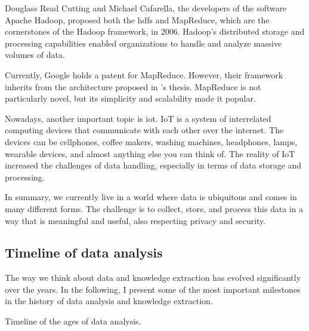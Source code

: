 Douglass Read Cutting and Michael Cafarella, the developers of the software Apache Hadoop,
proposed both the \gls{hdfs} and MapReduce, which are the
cornerstones of the Hadoop framework, in 2006.  Hadoop's distributed storage and
processing capabilities enabled organizations to handle and analyze massive volumes of
data.

Currently, Google holds a patent for
MapReduce.
However, their framework inherits from the architecture proposed in
\textcite{Hillis1985}'s thesis.
MapReduce is not particularly novel, but its simplicity and scalability made it popular.

Nowadays, another important topic is \gls{iot}.  IoT is a system of
interrelated computing devices that communicate with each other over the internet.
The devices can be cellphones, coffee makers, washing machines, headphones,
lamps, wearable devices, and almost anything else you can think of.  The reality of IoT increased the
challenges of data handling, especially in terms of data storage and processing.

In summary, we currently live in a world where data is ubiquitous and comes in many
different forms.  The challenge is to collect, store, and process this data in a way that
is meaningful and useful, also respecting privacy and security.

\subsection{Timeline of data analysis}
\label{sub:time-analysis}

The way we think about data and knowledge extraction has evolved significantly over the
years.  In the following, I present some of the most important milestones in the history
of data analysis and knowledge extraction.

\begin{figurebox}[label=fig:data-analysis-history]{Timeline of the ages of data analysis.}
  \centering
\end{figurebox}

